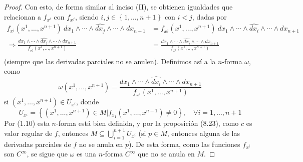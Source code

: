 \documentclass[12pt]{report}
\theoremstyle{largebreak}
\begin{document}
\begin{proof}
        Con esto, de forma similar al inciso (II), se obtienen igualdades
        que relacionan a $f_{x^i}$ con $f_{x^j}$, siendo $i,j\in\left\{1,\dots,n+1 \right\}$ con $i<j$, dadas por
        \begin{equation}
            \begin{split}
                f_{x^i}(x^1,\dots,x^{n+1})\:dx_1\wedge\cdots\wedge\widehat{dx_j}\wedge\cdots\wedge dx_{n+1}&=f_{x^j}(x^1,\dots,x^{n+1})\:dx_1\wedge\cdots\wedge\widehat{dx_i}\wedge\cdots\wedge dx_{n+1}\\
                \Rightarrow \frac{dx_1\wedge\cdots\wedge\widehat{dx_j}\wedge\cdots\wedge dx_{n+1}}{f_{x^j}(x^1,\dots,x^{n+1})}&=\frac{dx_1\wedge\cdots\wedge\widehat{dx_i}\wedge\cdots\wedge dx_{n+1}}{f_{x^i}(x^1,\dots,x^{n+1})}\\
            \end{split}
        \end{equation}
        (siempre que las derivadas parciales no se anulen). Definimos así a la $n$-forma $\omega$, como
        \begin{equation}
            \omega(x^1,\dots,x^{n+1})=\frac{dx_1\wedge\cdots\wedge\widehat{dx_i}\wedge\cdots\wedge dx_{n+1}}{f_{x^i}(x^1,\dots,x^{n+1})}
        \end{equation}
        si $(x^1,\dots,x^{n+1})\in U_{x^i}$, donde
        \begin{equation*}
            U_{x^i}=\left\{(x^1,\dots,x^{n+1})\in M|f_{x_1}(x^1,\dots,x^{n+1})\neq0 \right\},\quad \forall i=1,\dots,n+1
        \end{equation*}
        Por (1.10) esta $n$-forma está bien definida, y por la proposición (8.23), como $c$ es valor regular de $f$, entonces $M\subseteq \bigcup_{i=1}^{n+1}U_{x^i}$ (si $p\in M$, entonces alguna de las derivadas parciales de $f$ no se anula en $p$). De esta forma, como las funciones $f_{x^i}$ son $C^\infty$, se sigue que $\omega$ es una $n$-forma $C^\infty$ que no se anula en $M$.

    \end{proof}
\end{document}
